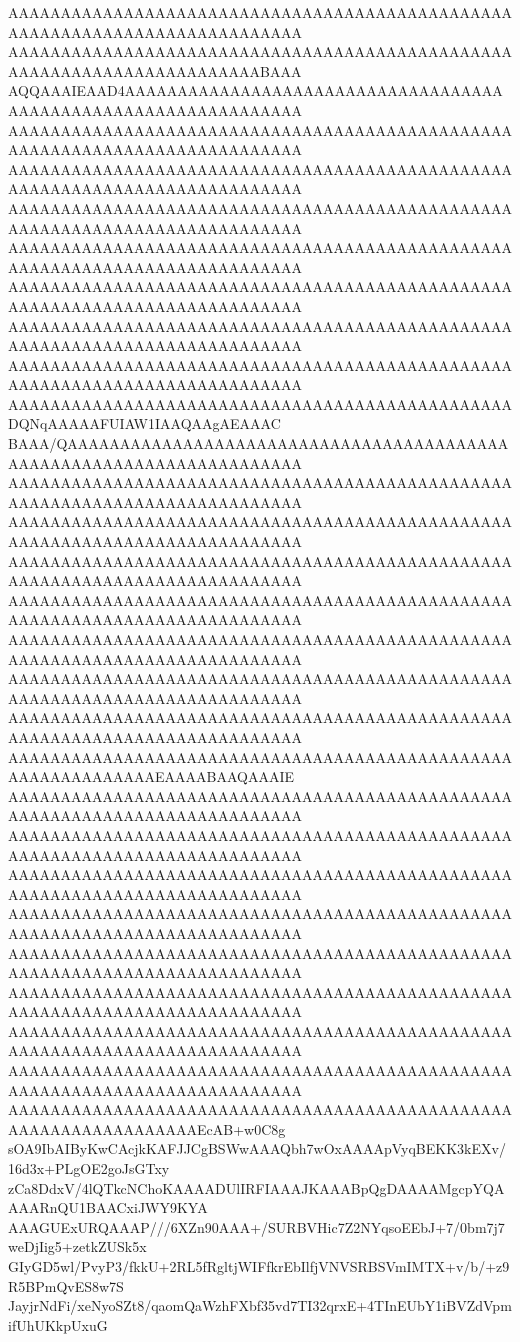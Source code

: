 AAAAAAAAAAAAAAAAAAAAAAAAAAAAAAAAAAAAAAAAAAAAAAAAAAAAAAAAAAAAAAAAAAAAAAAAAAAA
AAAAAAAAAAAAAAAAAAAAAAAAAAAAAAAAAAAAAAAAAAAAAAAAAAAAAAAAAAAAAAAAAAAAAAAABAAA
AQQAAAIEAAD4AAAAAAAAAAAAAAAAAAAAAAAAAAAAAAAAAAAAAAAAAAAAAAAAAAAAAAAAAAAAAAAA
AAAAAAAAAAAAAAAAAAAAAAAAAAAAAAAAAAAAAAAAAAAAAAAAAAAAAAAAAAAAAAAAAAAAAAAAAAAA
AAAAAAAAAAAAAAAAAAAAAAAAAAAAAAAAAAAAAAAAAAAAAAAAAAAAAAAAAAAAAAAAAAAAAAAAAAAA
AAAAAAAAAAAAAAAAAAAAAAAAAAAAAAAAAAAAAAAAAAAAAAAAAAAAAAAAAAAAAAAAAAAAAAAAAAAA
AAAAAAAAAAAAAAAAAAAAAAAAAAAAAAAAAAAAAAAAAAAAAAAAAAAAAAAAAAAAAAAAAAAAAAAAAAAA
AAAAAAAAAAAAAAAAAAAAAAAAAAAAAAAAAAAAAAAAAAAAAAAAAAAAAAAAAAAAAAAAAAAAAAAAAAAA
AAAAAAAAAAAAAAAAAAAAAAAAAAAAAAAAAAAAAAAAAAAAAAAAAAAAAAAAAAAAAAAAAAAAAAAAAAAA
AAAAAAAAAAAAAAAAAAAAAAAAAAAAAAAAAAAAAAAAAAAAAAAAAAAAAAAAAAAAAAAAAAAAAAAAAAAA
AAAAAAAAAAAAAAAAAAAAAAAAAAAAAAAAAAAAAAAAAAAAAAAADQNqAAAAAFUIAW1IAAQAAgAEAAAC
BAAA/QAAAAAAAAAAAAAAAAAAAAAAAAAAAAAAAAAAAAAAAAAAAAAAAAAAAAAAAAAAAAAAAAAAAAAA
AAAAAAAAAAAAAAAAAAAAAAAAAAAAAAAAAAAAAAAAAAAAAAAAAAAAAAAAAAAAAAAAAAAAAAAAAAAA
AAAAAAAAAAAAAAAAAAAAAAAAAAAAAAAAAAAAAAAAAAAAAAAAAAAAAAAAAAAAAAAAAAAAAAAAAAAA
AAAAAAAAAAAAAAAAAAAAAAAAAAAAAAAAAAAAAAAAAAAAAAAAAAAAAAAAAAAAAAAAAAAAAAAAAAAA
AAAAAAAAAAAAAAAAAAAAAAAAAAAAAAAAAAAAAAAAAAAAAAAAAAAAAAAAAAAAAAAAAAAAAAAAAAAA
AAAAAAAAAAAAAAAAAAAAAAAAAAAAAAAAAAAAAAAAAAAAAAAAAAAAAAAAAAAAAAAAAAAAAAAAAAAA
AAAAAAAAAAAAAAAAAAAAAAAAAAAAAAAAAAAAAAAAAAAAAAAAAAAAAAAAAAAAAAAAAAAAAAAAAAAA
AAAAAAAAAAAAAAAAAAAAAAAAAAAAAAAAAAAAAAAAAAAAAAAAAAAAAAAAAAAAAAAAAAAAAAAAAAAA
AAAAAAAAAAAAAAAAAAAAAAAAAAAAAAAAAAAAAAAAAAAAAAAAAAAAAAAAAAAAAAEAAAABAAQAAAIE
AAAAAAAAAAAAAAAAAAAAAAAAAAAAAAAAAAAAAAAAAAAAAAAAAAAAAAAAAAAAAAAAAAAAAAAAAAAA
AAAAAAAAAAAAAAAAAAAAAAAAAAAAAAAAAAAAAAAAAAAAAAAAAAAAAAAAAAAAAAAAAAAAAAAAAAAA
AAAAAAAAAAAAAAAAAAAAAAAAAAAAAAAAAAAAAAAAAAAAAAAAAAAAAAAAAAAAAAAAAAAAAAAAAAAA
AAAAAAAAAAAAAAAAAAAAAAAAAAAAAAAAAAAAAAAAAAAAAAAAAAAAAAAAAAAAAAAAAAAAAAAAAAAA
AAAAAAAAAAAAAAAAAAAAAAAAAAAAAAAAAAAAAAAAAAAAAAAAAAAAAAAAAAAAAAAAAAAAAAAAAAAA
AAAAAAAAAAAAAAAAAAAAAAAAAAAAAAAAAAAAAAAAAAAAAAAAAAAAAAAAAAAAAAAAAAAAAAAAAAAA
AAAAAAAAAAAAAAAAAAAAAAAAAAAAAAAAAAAAAAAAAAAAAAAAAAAAAAAAAAAAAAAAAAAAAAAAAAAA
AAAAAAAAAAAAAAAAAAAAAAAAAAAAAAAAAAAAAAAAAAAAAAAAAAAAAAAAAAAAAAAAAAAAAAAAAAAA
AAAAAAAAAAAAAAAAAAAAAAAAAAAAAAAAAAAAAAAAAAAAAAAAAAAAAAAAAAAAAAAAAAEcAB+w0C8g
sOA9IbAIByKwCAcjkKAFJJCgBSWwAAAQbh7wOxAAAApVyqBEKK3kEXv/16d3x+PLgOE2goJsGTxy
zCa8DdxV/4lQTkcNChoKAAAADUlIRFIAAAJKAAABpQgDAAAAMgcpYQAAAARnQU1BAACxiJWY9KYA
AAAGUExURQAAAP///6XZn90AAA+/SURBVHic7Z2NYqsoEEbJ+7/0bm7j7weDjIig5+zetkZUSk5x
GIyGD5wl/PvyP3/fkkU+2RL5fRgltjWIFfkrEbIlfjVNVSRBSVmIMTX+v/b/+z9R5BPmQvES8w7S
JayjrNdFi/xeNyoSZt8/qaomQaWzhFXbf35vd7TI32qrxE+4TInEUbY1iBVZdVpmifUhUKkpUxuG
